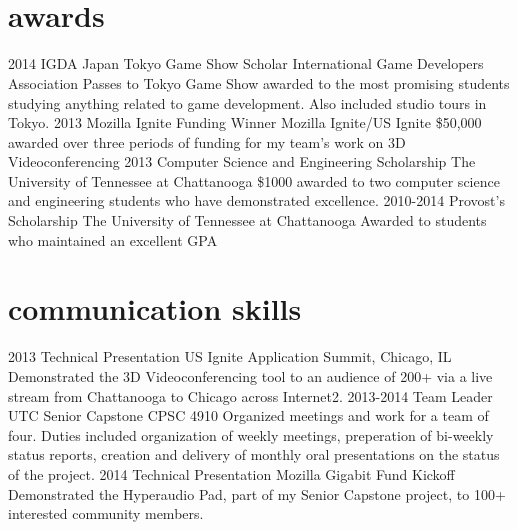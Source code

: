 \documentclass[]{friggeri-cv} %
\begin{document}
\\
\\

\section{awards}

\begin{entrylist}
\entry
{2014}
{IGDA Japan Tokyo Game Show Scholar}
{International Game Developers Association}
{Passes to Tokyo Game Show awarded to the most promising students studying anything related to game development. Also included studio tours in Tokyo.}
\entry
{2013}
{Mozilla Ignite Funding Winner}
{Mozilla Ignite/US Ignite}
{\$50,000 awarded over three periods of funding for my team's work on 3D Videoconferencing}
\entry
{2013}
{Computer Science and Engineering Scholarship}
{The University of Tennessee at Chattanooga}
{\$1000 awarded to two computer science and engineering students who have demonstrated excellence.}
\entry
{2010-2014}
{Provost's Scholarship}
{The University of Tennessee at Chattanooga}
{Awarded to students who maintained an excellent GPA}
\end{entrylist}


\section{communication skills}

\begin{entrylist}
\entry
{2013}
{Technical Presentation}
{US Ignite Application Summit, Chicago, IL}
{Demonstrated the 3D Videoconferencing tool to an audience of 200+ via a live stream from Chattanooga to Chicago across Internet2.}
\entry
{2013-2014}
{Team Leader}
{UTC Senior Capstone CPSC 4910}
{Organized meetings and work for a team of four. Duties included organization of weekly meetings, preperation of bi-weekly status reports, creation and delivery
of monthly oral presentations on the status of the project.}
\entry
{2014}
{Technical Presentation}
{Mozilla Gigabit Fund Kickoff}
{Demonstrated the Hyperaudio Pad, part of my Senior Capstone project, to 100+ interested community members.}
\end{entrylist}
\end{document}
